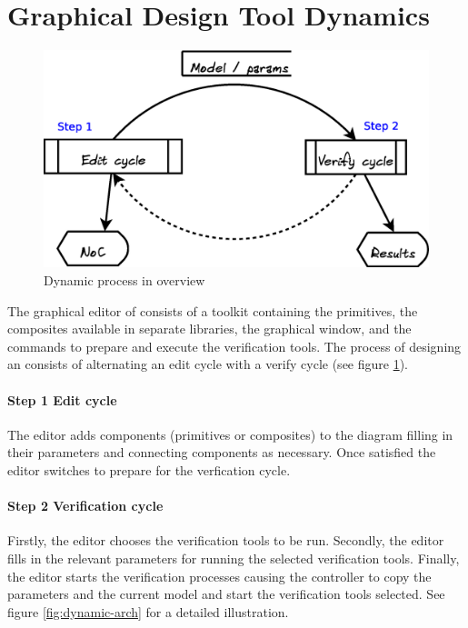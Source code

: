 
\section{Graphical Design Tool Dynamics}

\pagedepth\maxdimen

\begin{figure}
	\includegraphics[width=.95\linewidth]{../architecture-dynamic-overview}
	\caption{Dynamic process in overview}
	\label{fig:overview-dynamic}
\end{figure}

The graphical editor of \Noc consists of a toolkit containing
the \xmas primitives, the composites available in separate 
libraries, the graphical window, and the commands to 
prepare and execute the verification tools. The process of 
designing an \Noc consists of alternating an edit cycle with a verify cycle 
(see figure \ref{fig:overview-dynamic}).

\paragraph{Step 1 Edit cycle} The editor adds components (primitives or 
composites) to the \Noc diagram filling in their parameters and connecting 
components as necessary. Once satisfied the editor switches to prepare 
for the verfication cycle.

\paragraph{Step 2 Verification cycle} 
Firstly, the editor chooses the verification tools to be run.
Secondly, the editor fills in the relevant parameters for running the selected 
verification tools. Finally, the editor starts the verification processes causing
the controller to copy the parameters and the current \Noc model and start
the verification tools selected. See figure \ref{fig:dynamic-arch} for a 
detailed illustration.


